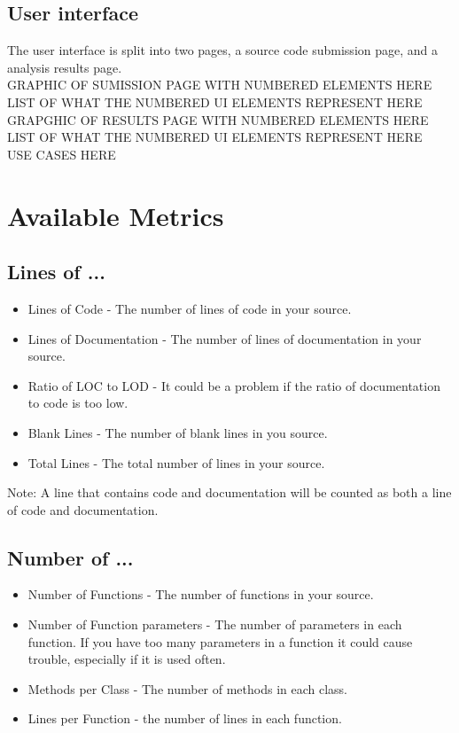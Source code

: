 \documentclass{scrreprt}
\begin{document}
	\section{User interface}
	The user interface is split into two pages, a source code submission page, and a analysis results page. \\
	
	GRAPHIC OF SUMISSION PAGE WITH NUMBERED ELEMENTS HERE \\
	
	LIST  OF WHAT THE NUMBERED UI ELEMENTS REPRESENT HERE \\
	
	GRAPGHIC OF RESULTS PAGE WITH NUMBERED ELEMENTS HERE \\
	
	LIST  OF WHAT THE NUMBERED UI ELEMENTS REPRESENT HERE \\
	
	USE CASES HERE \\
	

	{\let\clearpage\relax \chapter{Available Metrics}}
	
	\section{Lines of ...}
	\begin{itemize}
		\item Lines of Code - The number of lines of code in your source.
		\item Lines of Documentation - The number of lines of documentation in your source.
		\item Ratio of LOC to LOD - It could be a problem if the ratio of documentation to code is too low.
		\item Blank Lines - The number of blank lines in you source.
		\item Total Lines - The total number of lines in your source.
	\end{itemize}
	Note: A line that contains code and documentation will be counted as both a line of code and documentation.
	
	\section{Number of ...}
	\begin{itemize}
		\item Number of Functions - The number of functions in your source.
		\item Number of Function parameters - The number of parameters in each function. If you have too many parameters in a function it could cause trouble, especially if it is used often.
		\item Methods per Class - The number of methods in each class.
		\item Lines per Function - the number of lines in each function.
	\end{itemize}
	
\end{document}
